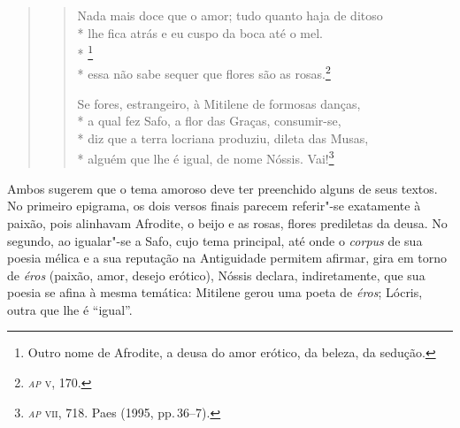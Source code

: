 \begin{quote}
\begin{verse}
Nada mais doce que o amor; tudo quanto haja de ditoso\\*
lhe fica atrás e eu cuspo da boca até o mel.\\*
\footnote{ Outro nome de Afrodite, a deusa do amor erótico, da beleza, da sedução.} \\*
essa não sabe sequer que flores são as rosas.\footnote{\emph{\textsc{ap}} \textsc{v}, 170.}\\

\medskip

Se fores, estrangeiro, à Mitilene de formosas danças,\\*
a qual fez Safo, a flor das Graças, consumir-se,\\* 
diz que a terra locriana produziu, dileta das Musas,\\*
alguém que lhe é igual, de nome Nóssis. Vai!\footnote{\emph{\textsc{ap}} \textsc{vii}, 718. Paes (1995, pp.\,36--7).}
\end{verse}
\end{quote}

Ambos sugerem que o tema amoroso deve ter preenchido alguns de seus textos. No
primeiro epigrama, os dois versos finais parecem referir"-se exatamente à
paixão, pois alinhavam Afrodite, o beijo e as rosas, flores prediletas da
deusa. No segundo, ao igualar"-se a Safo, cujo tema principal, até onde o
\emph{corpus} de sua poesia mélica e a sua reputação na Antiguidade permitem
afirmar, gira em torno de \emph{éros} (paixão, amor, desejo erótico), Nóssis
declara, indiretamente, que sua poesia se afina à mesma temática: Mitilene
gerou uma poeta de \emph{éros}; Lócris, outra que lhe é ``igual”.

